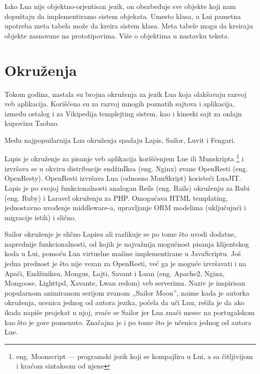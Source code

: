 \documentclass[a4paper]{article}
\begin{document}


Iako Lua nije objektno-orjentisan jezik, on obezbeđuje sve objekte koji nam dopuštaju da implementiramo sistem objekata. Umesto klasa, u Lui pametna upotreba meta tabela može da kreira sistem klasa. Meta tabele mogu da kreiraju objekte zasnovane na prototipovima. Više o objektima u nastavku teksta.


\section{Okruženja}
\label{sec:okruzenja}


Tokom godina, nastala su brojna okruženja za jezik Lua koja olakšavaju razvoj veb aplikacija. Korišćena su za razvoj mnogih poznatih sajtova i aplikacija, između ostalog i za Vikipedija templejting sistem, kao i kineski sajt za onlajn kupovinu Taobao.

Među najpopuilarnija Lua okruženja spadaju Lapis, Sailor, Luvit i Fengari.

Lapis je okruženje za pisanje veb aplikacija korišćenjem Lue ili Munskripta \footnote{eng. Moonscript --- programski jezik koji se kompajlira u Lui, a sa čitljivijom i kraćom sintaksom od njene} i izvršava se u okviru distribucije endžinIksa (eng. Nginx) zvane OpenResti (eng. OpenResty). OpenResti izvršava Lua (odnosno MunSkript) koristeći LuaJIT. Lapis je po svojoj funkcionalnosti analogan Reils (eng. Rails) okruženju za Rubi (eng. Ruby) i Laravel okruženju za PHP. Omogućava HTML templating, jednostavno uvođenje middleware-a, upravljanje ORM modelima (uključujući i migracije istih) i slično. 

Sailor okruženje je slično Lapisu ali razlikuje se po tome što uvodi dodatne, naprednije funkcionalnosti, od kojih je najvažnija mogućnost pisanja klijentskog koda u Lui, pomoću Lua virtuelne mašine implementirane u JavaScriptu. Još jedna prednost je što nije vezan za OpenResti, već ga je moguće izvršavati i na Apači, Endžiniksu, Mongus, Lajti, Savant i Luan (eng. Apache2, Nginx, Mongoose, Lighttpd, Xavante, Lwan redom) veb serverima. Naziv je inspirisan popularnom animiranom serijom zvanom ,,Sailor Moon'', naime kada je autorka okruženja, ucenica jednog od autora jezika, počela da uči Luu, rešila je da ako ikada napiše projekat u njoj, zvaće se Sailor jer Lua znači mesec na portugalskom kao što je gore pomenuto. Značajna je i po tome što je učenica jednog od autora Lue\cite{frameworkSailor}. 
\end{document}
